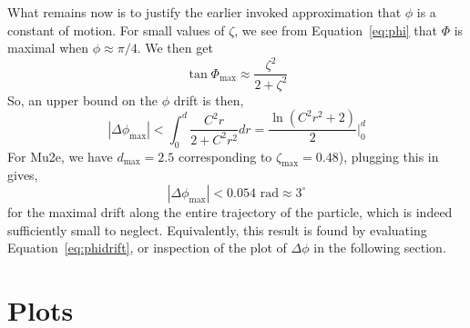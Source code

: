\documentclass[twoside]{article}
\begin{document}
\begin{multicols}{2}
What remains now is to justify the earlier invoked approximation that $\phi$ is a constant of motion. For small values of $\zeta$, we see from Equation~\ref{eq:phi} that $\Phi$ is maximal when $\phi \approx \pi/4$. We then get
\begin{equation}
\label{eq:phimax}
              \tan \Phi_\text{max} \approx \frac{\zeta^2}{2 + \zeta^2}            
\end{equation}
So, an upper bound on the $\phi$ drift is then,
\begin{equation}
\label{eq:phimax}
            | \Delta \phi_\text{max} | <  \int^d_0 \frac{C^2 r}{2 + C^2 r^2} dr  = \frac{\ln(C^2 r^2 + 2)}{2} \bigg|^d_0
\end{equation}
For Mu2e, we have $d_\text{max} = 2.5$ corresponding to $\zeta_\text{max} = 0.48$), plugging this in gives, 
\begin{equation}
              | \Delta \phi_\text{max} | <  0.054 \text{ rad}  \approx 3^\circ
\end{equation}
for the maximal drift along the entire trajectory of the particle, which is indeed sufficiently small to neglect. Equivalently, this result is found by evaluating  Equation~\ref{eq:phidrift}, or inspection of the plot of $\Delta \phi$ in the following section.























\section{Plots}





\end{multicols}
\end{document}
